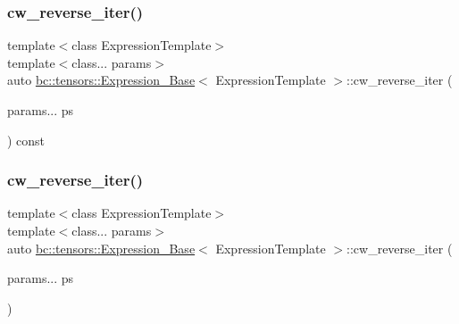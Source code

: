 \subsubsection{\texorpdfstring{cw\+\_\+reverse\+\_\+iter()}{cw\_reverse\_iter()}\hspace{0.1cm}{\footnotesize\ttfamily [1/2]}}
{\footnotesize\ttfamily template$<$class Expression\+Template$>$ \\
template$<$class... params$>$ \\
auto \hyperlink{classbc_1_1tensors_1_1Expression__Base}{bc\+::tensors\+::\+Expression\+\_\+\+Base}$<$ Expression\+Template $>$\+::cw\+\_\+reverse\+\_\+iter (\begin{DoxyParamCaption}\item[{params...}]{ps }\end{DoxyParamCaption}) const\hspace{0.3cm}{\ttfamily [inline]}}

\mbox{\label{classbc_1_1tensors_1_1Expression__Base_aef6156b25763eda80184e7d94d118842}} 
\subsubsection{\texorpdfstring{cw\+\_\+reverse\+\_\+iter()}{cw\_reverse\_iter()}\hspace{0.1cm}{\footnotesize\ttfamily [2/2]}}
{\footnotesize\ttfamily template$<$class Expression\+Template$>$ \\
template$<$class... params$>$ \\
auto \hyperlink{classbc_1_1tensors_1_1Expression__Base}{bc\+::tensors\+::\+Expression\+\_\+\+Base}$<$ Expression\+Template $>$\+::cw\+\_\+reverse\+\_\+iter (\begin{DoxyParamCaption}\item[{params...}]{ps }\end{DoxyParamCaption})\hspace{0.3cm}{\ttfamily [inline]}}

\mbox{\label{classbc_1_1tensors_1_1Expression__Base_a216a776614af590add5560a1a690cc54}} 
